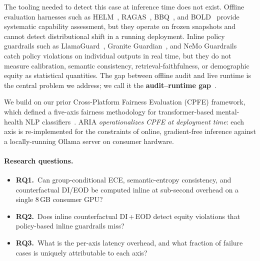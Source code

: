 \documentclass{article}
\begin{document}
The tooling needed to detect this case at inference time does not exist.
Offline evaluation harnesses such as HELM~\citep{liang2022helm},
RAGAS~\citep{es2023ragas}, BBQ~\citep{parrish2022bbq}, and
BOLD~\citep{dhamala2021bold} provide systematic capability assessment, but
they operate on frozen snapshots and cannot detect distributional shift in
a running deployment.
Inline policy guardrails such as LlamaGuard~\citep{inan2023llamaguard},
Granite Guardian~\citep{padhi2024graniteguardian}, and NeMo
Guardrails~\citep{nvidia2023nemo} catch policy violations on individual
outputs in real time, but they do not measure calibration, semantic
consistency, retrieval-faithfulness, or demographic equity as statistical
quantities.
The gap between offline audit and live runtime is the central problem we
address; we call it the \textbf{audit--runtime gap}~\citep{auditgap2025}.

We build on our prior Cross-Platform Fairness Evaluation (CPFE) framework,
which defined a five-axis fairness methodology for transformer-based
mental-health NLP classifiers~\citep{pall2026cpfe}.
ARIA \emph{operationalizes CPFE at deployment time}: each axis is
re-implemented for the constraints of online, gradient-free inference
against a locally-running Ollama server on consumer hardware.

\paragraph{Research questions.}
\begin{itemize}
  \item \textbf{RQ1.}~Can group-conditional ECE, semantic-entropy
        consistency, and counterfactual DI/EOD be computed inline at
        sub-second overhead on a single 8\,GB consumer GPU?
  \item \textbf{RQ2.}~Does inline counterfactual DI\,+\,EOD detect equity
        violations that policy-based inline guardrails miss?
  \item \textbf{RQ3.}~What is the per-axis latency overhead, and what
        fraction of failure cases is uniquely attributable to each axis?
\end{itemize}
\end{document}
